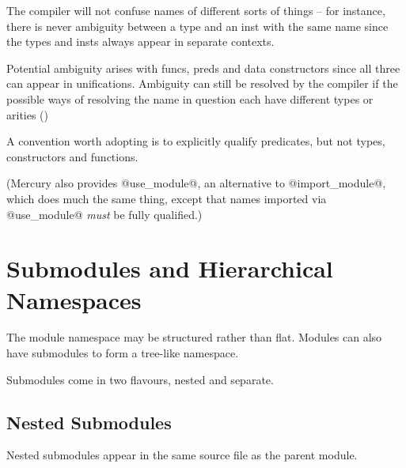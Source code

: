 The compiler will not confuse names of different sorts of
things -- for instance, there is never ambiguity between a type
and an inst with the same name since the types and insts
always appear in separate contexts.

Potential ambiguity arises with funcs, preds and data
constructors since all three can appear in unifications.
Ambiguity can still be resolved by the compiler if the
possible ways of resolving the name in question each have
different types or arities ()

A convention worth adopting is to explicitly qualify
predicates, but not types, constructors and functions.

(Mercury also provides @use_module@, an alternative to @import_module@,
which does much the same thing, except that names imported via
@use_module@ \emph{must} be fully qualified.)

\section{Submodules and Hierarchical Namespaces}

The module namespace may be structured rather than flat.  Modules can
also have submodules to form a tree-like namespace.

Submodules come in two flavours, nested and separate.

\subsection{Nested Submodules}

Nested submodules appear in the same source file as the parent module.

